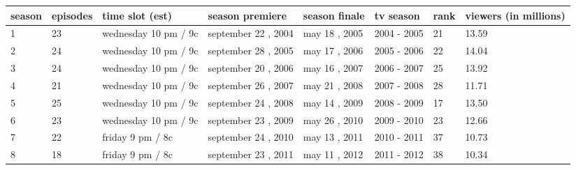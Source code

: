 \documentclass{article}
\begin{document}
\begin{tabular}{llllllll}
\toprule
season & episodes & time slot (est) & season premiere & season finale & tv season & rank & viewers (in millions) \\
\midrule
1 & 23 & wednesday 10 pm / 9c & september 22 , 2004 & may 18 , 2005 & 2004 - 2005 & 21 & 13.59 \\
2 & 24 & wednesday 10 pm / 9c & september 28 , 2005 & may 17 , 2006 & 2005 - 2006 & 22 & 14.04 \\
3 & 24 & wednesday 10 pm / 9c & september 20 , 2006 & may 16 , 2007 & 2006 - 2007 & 25 & 13.92 \\
4 & 21 & wednesday 10 pm / 9c & september 26 , 2007 & may 21 , 2008 & 2007 - 2008 & 28 & 11.71 \\
5 & 25 & wednesday 10 pm / 9c & september 24 , 2008 & may 14 , 2009 & 2008 - 2009 & 17 & 13.50 \\
6 & 23 & wednesday 10 pm / 9c & september 23 , 2009 & may 26 , 2010 & 2009 - 2010 & 23 & 12.66 \\
7 & 22 & friday 9 pm / 8c & september 24 , 2010 & may 13 , 2011 & 2010 - 2011 & 37 & 10.73 \\
8 & 18 & friday 9 pm / 8c & september 23 , 2011 & may 11 , 2012 & 2011 - 2012 & 38 & 10.34 \\
\bottomrule
\end{tabular}
\end{document}
